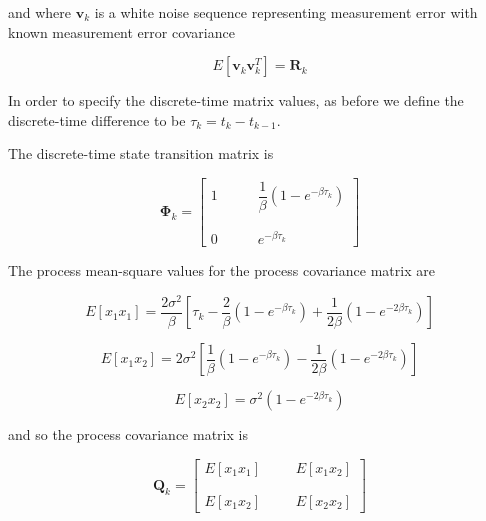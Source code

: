 \documentclass[12pt]{article}
\begin{document}
and where $\mathbf{v}_k$ is a white noise sequence representing measurement error with
known measurement error covariance

\begin{equation}
    E[\mathbf{v}_k \mathbf{v}_k^T] = \mathbf{R}_k
    \label{eq:IGM-discrete-measurement-covariance}
\end{equation}

In order to specify the discrete-time matrix values, as before we define the discrete-time
difference to be $\tau_k = t_k - t_{k-1}$.

The discrete-time state transition matrix is

\begin{equation}
    \mathbf{\Phi}_k = 
    \begin{bmatrix}
    1  & \phantom{m} &  \dfrac{1}{\beta} \left ( 1 - e^{- \beta \tau_k} \right ) \\
    \phantom{m} \\
    0  & \phantom{m} &  e^{- \beta \tau_k}
    \end{bmatrix}
    \label{eq:IGM-state-transition}
\end{equation}

The process mean-square values for the process covariance matrix are

\begin{equation}
    E[x_1 x_1] = \frac{2 \sigma^2}{\beta}
        \left [
            \tau_k - \frac{2}{\beta} \left ( 1 - e^{- \beta \tau_k} \right )
                   + \frac{1}{2 \beta} \left ( 1 - e^{-2 \beta \tau_k} \right )
        \right ]
    \label{eq:IGM-Ex1x1}
\end{equation}

\begin{equation}
    E[x_1 x_2] = 2 \sigma^2
        \left [
            \frac{1}{\beta} \left ( 1 - e^{- \beta \tau_k} \right )
            - \frac{1}{2 \beta} \left ( 1 - e^{-2 \beta \tau_k} \right )
        \right ]
    \label{eq:IGM-Ex1x2}
\end{equation}

\begin{equation}
    E[x_2 x_2] = \sigma^2 \left ( 1 - e^{-2 \beta \tau_k} \right )
    \label{eq:IGM-Ex2x2}
\end{equation}

and so the process covariance matrix is

\begin{equation}
    \mathbf{Q}_k = 
    \begin{bmatrix}
    E[x_1 x_1]  & \phantom{m} &  E[x_1 x_2] \\
    \phantom{m} \\
    E[x_1 x_2]  & \phantom{m} &  E[x_2 x_2]
    \end{bmatrix}
    \label{eq:IGM-process-Q}
\end{equation}
\end{document}
